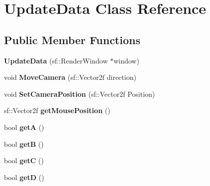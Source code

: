 \hypertarget{class_update_data}{\section{Update\-Data Class Reference}
\label{class_update_data}
}
\subsection*{Public Member Functions}
\begin{DoxyCompactItemize}
\item 
\hypertarget{class_update_data_a6882b130592cc63aa1e6f1ea36dcf349}{{\bfseries Update\-Data} (sf\-::\-Render\-Window $\ast$window)}\label{class_update_data_a6882b130592cc63aa1e6f1ea36dcf349}

\item 
\hypertarget{class_update_data_a2ff2fe51ef63293e7d4e831cc95b0837}{void {\bfseries Move\-Camera} (sf\-::\-Vector2f direction)}\label{class_update_data_a2ff2fe51ef63293e7d4e831cc95b0837}

\item 
\hypertarget{class_update_data_a17324f6ed80111443fef3da6208fb6bc}{void {\bfseries Set\-Camera\-Position} (sf\-::\-Vector2f Position)}\label{class_update_data_a17324f6ed80111443fef3da6208fb6bc}

\item 
\hypertarget{class_update_data_a81f654ff6f0879b2c3129662801232ec}{sf\-::\-Vector2f {\bfseries get\-Mouse\-Position} ()}\label{class_update_data_a81f654ff6f0879b2c3129662801232ec}

\item 
\hypertarget{class_update_data_a34912b36f314c985f9f725acae8bfb87}{bool {\bfseries get\-A} ()}\label{class_update_data_a34912b36f314c985f9f725acae8bfb87}

\item 
\hypertarget{class_update_data_a0485ded87f129d052690ba237b1e41dd}{bool {\bfseries get\-B} ()}\label{class_update_data_a0485ded87f129d052690ba237b1e41dd}

\item 
\hypertarget{class_update_data_a8a116007d883d35dbdb39eca6d22b80a}{bool {\bfseries get\-C} ()}\label{class_update_data_a8a116007d883d35dbdb39eca6d22b80a}

\item 
\hypertarget{class_update_data_aa9bebf60b7c0d589271abf0c7c5195f4}{bool {\bfseries get\-D} ()}\label{class_update_data_aa9bebf60b7c0d589271abf0c7c5195f4}


\end{DoxyCompactItemize}
